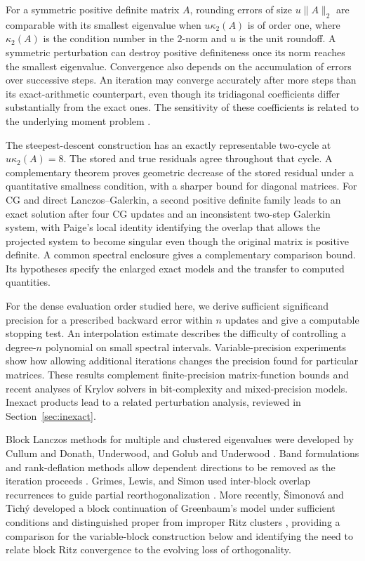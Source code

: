 \documentclass[11pt]{article}
\theoremstyle{definition}
\begin{document}
For a symmetric positive definite matrix $A$, rounding errors of size
$u\|A\|_2$ are comparable with its smallest eigenvalue when $u\kappa_2(A)$
is of order one, where $\kappa_2(A)$ is the condition number in the $2$-norm
and $u$ is the unit roundoff. A symmetric perturbation can destroy positive
definiteness once its norm reaches the smallest eigenvalue.
Convergence also depends on the accumulation of errors
over successive steps. An iteration may converge accurately after more
steps than its exact-arithmetic counterpart, even though its tridiagonal
coefficients differ substantially from the exact ones. The sensitivity
of these coefficients is related to the underlying moment problem
\cite{Knizhnerman1996,ChenTrogdon2024}.

The steepest-descent construction has an exactly representable two-cycle
at $u\kappa_2(A)=8$.
The stored and true residuals agree throughout that cycle. A complementary
theorem proves geometric decrease of the stored residual under a quantitative
smallness condition, with a sharper bound for diagonal matrices.
For CG and direct Lanczos--Galerkin, a second positive definite family leads
to an exact solution after four CG updates and an inconsistent two-step
Galerkin system, with Paige's local identity identifying the overlap that
allows the projected system to become singular even though the original
matrix is positive definite. A common spectral enclosure gives a
complementary comparison bound. Its hypotheses specify the enlarged exact
models and the transfer to computed quantities.

For the dense evaluation order studied here, we derive sufficient
significand precision for a prescribed
backward error within $n$ updates and give a computable stopping test.
An interpolation estimate describes the difficulty of controlling a degree-$n$
polynomial on small spectral intervals. Variable-precision experiments show
how allowing additional iterations changes the precision found for particular
matrices. These results complement finite-precision matrix-function bounds
\cite{DruskinKnizhnerman1991,DruskinGreenbaumKnizhnerman1998,
MuscoMuscoSidford2018,ChenGreenbaumMuscoMusco2022} and recent analyses of
Krylov solvers in bit-complexity and mixed-precision models.
Inexact products lead to a related perturbation analysis, reviewed in
Section~\ref{sec:inexact}.

Block Lanczos methods for multiple and clustered eigenvalues were developed
by Cullum and Donath,
Underwood, and Golub and Underwood
\cite{CullumDonath1974,Underwood1975,GolubUnderwood1977}.
Band formulations and rank-deflation methods allow dependent directions to
be removed as the iteration proceeds
\cite{Ruhe1979,BaiDayYe1999,AliagaBoleyFreundHernandez2000,
FreundMalhotra1997,Baglama2000}.
Grimes, Lewis, and Simon used inter-block overlap recurrences to guide partial
reorthogonalization \cite{GrimesLewisSimon1994}.
More recently, \v{S}imonov\'a and Tich\'y developed a block continuation of
Greenbaum's model under sufficient conditions and distinguished proper from
improper Ritz clusters \cite{SimonovaTichy2025}, providing a comparison
for the variable-block construction below and identifying the need to relate
block Ritz convergence to the evolving loss of orthogonality.
\end{document}
